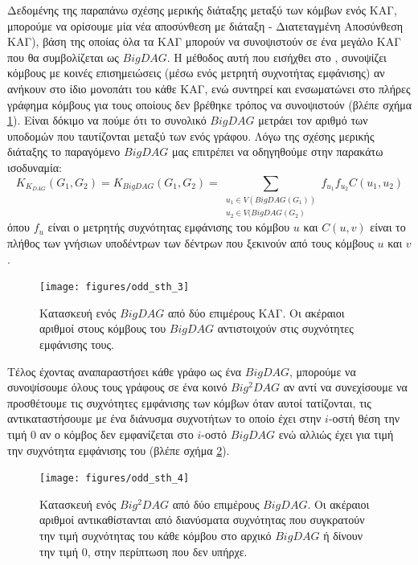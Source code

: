 Δεδομένης της παραπάνω σχέσης μερικής διάταξης μεταξύ των κόμβων ενός ΚΑΓ, μπορούμε να ορίσουμε μία νέα αποσύνθεση με διάταξη  - Διατεταγμένη Αποσύνθεση ΚΑΓ), βάση της οποίας όλα τα ΚΑΓ μπορούν να συνοψιστούν σε ένα μεγάλο ΚΑΓ που θα συμβολίζεται ως $BigDAG$.
Η μέθοδος αυτή που εισήχθει στο \cite[MinimalDAG:  2, p. 3]{Martino2006}, συνοψίζει κόμβους με κοινές επισημειώσεις (μέσω ενός μετρητή συχνοτήτας εμφάνισης) αν ανήκουν στο ίδιο μονοπάτι του κάθε ΚΑΓ, ενώ συντηρεί και ενσωματώνει στο πλήρες γράφημα κόμβους για τους οποίους δεν βρέθηκε τρόπος να συνοψιστούν  (βλέπε σχήμα \ref{fig:odd_sth_3}).
Είναι δόκιμο να πούμε ότι το συνολικό $BigDAG$ μετράει τον αριθμό των υποδομών που ταυτίζονται μεταξύ των  ενός γράφου.
Λόγω της σχέσης μερικής διάταξης το παραγόμενο $BigDAG$ μας επιτρέπει να οδηγηθούμε στην παρακάτω ισοδυναμία:
\begin{equation}
K_{K_{DAG}}(G_{1}, G_{2}) = K_{BigDAG}(G_{1}, G_{2}) = \sum_{\substack{u_{1} \in V(BigDAG(G_{1}))\\ u_{2} \in V(BigDAG(G_{2})}} f_{u_{1}}f_{u_{2}}C(u_{1}, u_{2})
\end{equation}
όπου $f_{u}$ είναι ο μετρητής συχνότητας εμφάνισης του κόμβου $u$ και $C(u, v)$ είναι το πλήθος των γνήσιων υποδέντρων των δέντρων που ξεκινούν από τους κόμβους $u$ και $v$.
\begin{figure}[]
\centering
\texttt{[image: figures/odd\_sth\_3]}
\caption[Κατασκευή ενός $BigDAG$ από δύο επιμέρους ΚΑΓ.]{Κατασκευή ενός $BigDAG$ από δύο επιμέρους ΚΑΓ. Οι ακέραιοι αριθμοί στους κόμβους του $BigDAG$ αντιστοιχούν στις συχνότητες εμφάνισης τους.}
\label{fig:odd_sth_3}
\end{figure}

Τέλος έχοντας αναπαραστήσει κάθε γράφο ως ένα $BigDAG$, μπορούμε να συνοψίσουμε όλους τους γράφους σε ένα κοινό $Big^{2}DAG$ αν αντί να συνεχίσουμε να προσθέτουμε τις συχνότητες εμφάνισης των κόμβων όταν αυτοί τατίζονται, τις αντικαταστήσουμε με ένα διάνυσμα συχνοτήτων το οποίο έχει στην $i$-οστή θέση την τιμή $0$ αν ο κόμβος δεν εμφανίζεται στο $i$-οστό $BigDAG$ ενώ αλλιώς έχει για τιμή την συχνότητα εμφάνισης του (βλέπε σχήμα \ref{fig:odd_sth_4}).
\begin{figure}[]
\centering
\texttt{[image: figures/odd\_sth\_4]}
\caption[Κατασκευή ενός $Big^{2}DAG$ από δύο επιμέρους $BigDAG$.]{Κατασκευή ενός $Big^{2}DAG$ από δύο επιμέρους $BigDAG$. Οι ακέραιοι αριθμοί αντικαθίστανται από διανύσματα συχνότητας που συγκρατούν την τιμή συχνότητας του κάθε κόμβου στο αρχικό $BigDAG$ ή δίνουν την τιμή $0$, στην περίπτωση που δεν υπήρχε.}
\label{fig:odd_sth_4}
\end{figure}

